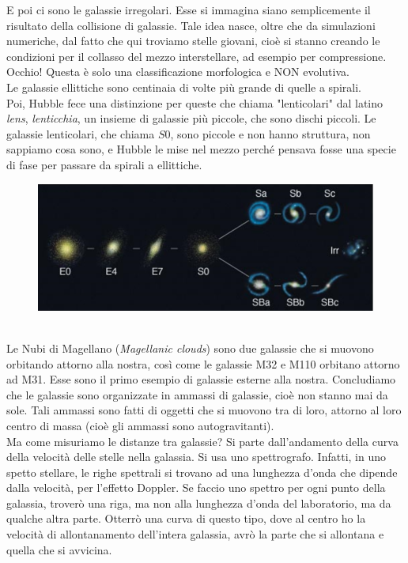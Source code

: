 \documentclass[a4paper,11pt]{article}
\begin{document}
E poi ci sono le galassie irregolari. Esse si immagina siano semplicemente il risultato della collisione di galassie. Tale idea nasce, oltre che da simulazioni numeriche, dal fatto che qui troviamo stelle giovani, cioè si stanno creando le condizioni per il collasso del mezzo interstellare, ad esempio per compressione.\\
Occhio! Questa è solo una classificazione morfologica e NON evolutiva.\\
Le galassie ellittiche sono centinaia di volte più grande di quelle a spirali.\\
Poi, Hubble fece una distinzione per queste che chiama "lenticolari" dal latino \textit{lens}, \textit{lenticchia}, un insieme di galassie più piccole, che sono dischi piccoli. Le galassie lenticolari, che chiama $S0$, sono piccole e non hanno struttura, non sappiamo cosa sono, e Hubble le mise nel mezzo perché pensava fosse una specie di fase per passare da spirali a ellittiche. 
\begin{figure} [h]
        \centering
        \includegraphics[width=\textwidth]{immagini_lezioni12-12/bho.png}
        \label{}
    \end{figure}\\
Le Nubi di Magellano (\textit{Magellanic clouds}) sono due galassie che si muovono orbitando attorno alla nostra, così come le galassie M32 e M110 orbitano attorno ad M31. Esse sono il primo esempio di galassie esterne alla nostra. Concludiamo che le galassie sono organizzate in ammassi di galassie, cioè non stanno mai da sole. Tali ammassi sono fatti di oggetti che si muovono tra di loro, attorno al loro centro di massa (cioè gli ammassi sono autogravitanti).\\
Ma come misuriamo le distanze tra galassie? Si parte dall'andamento della curva della velocità delle stelle nella galassia. Si usa uno spettrografo. Infatti, in uno spetto stellare, le righe spettrali si trovano ad una lunghezza d'onda che dipende dalla velocità, per l'effetto Doppler. Se faccio uno spettro per ogni punto della galassia, troverò una riga, ma non alla lunghezza d'onda del laboratorio, ma da qualche altra parte. Otterrò una curva di questo tipo, dove al centro ho la velocità di allontanamento dell'intera galassia, avrò la parte che si allontana e quella che si avvicina.
\end{document}
